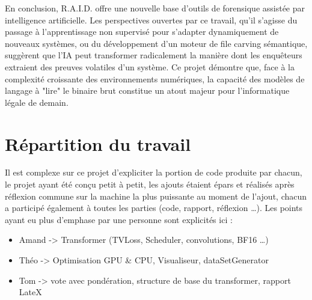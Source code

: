 \documentclass[12pt]{report}
\begin{document}
    En conclusion, R.A.I.D. offre une nouvelle base d'outils de forensique assistée par intelligence artificielle. Les perspectives ouvertes par ce travail, qu'il s'agisse du passage à l'apprentissage non supervisé pour s'adapter dynamiquement de nouveaux systèmes, ou du développement d'un moteur de file carving sémantique, suggèrent que l'IA peut transformer radicalement la manière dont les enquêteurs extraient des preuves volatiles d'un système. Ce projet démontre que, face à la complexité croissante des environnements numériques, la capacité des modèles de langage à "lire" le binaire brut constitue un atout majeur pour l'informatique légale de demain.

    \chapter*{Répartition du travail}\label{chap:repartition_travail}
    Il est complexe sur ce projet d'expliciter la portion de code produite par chacun, le projet ayant été conçu petit à petit, les ajouts étaient épars et réalisés après réflexion commune sur la machine la plus puissante au moment de l'ajout, chacun a participé également à toutes les parties (code, rapport, réflexion …).
    Les points ayant eu plus d'emphase par une personne sont explicités ici :
    \begin{itemize}
        \item Amand -> Transformer (TVLoss, Scheduler, convolutions, BF16 …)
        \item Théo -> Optimisation GPU \& CPU, Visualiseur, dataSetGenerator
        \item Tom -> vote avec pondération, structure de base du transformer, rapport LateX
    \end{itemize}

    \printbibliography[title={Bibliographie}, heading=bibintoc]
\end{document}
